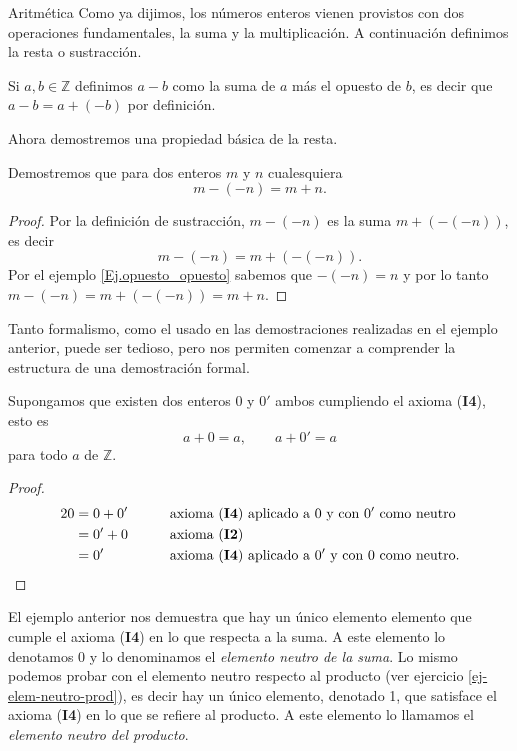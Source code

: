 \begin{section}{Aritmética}
Como ya dijimos, los números enteros vienen provistos con dos operaciones fundamentales, la suma y la multiplicación.
A continuación definimos la resta o sustracción. 

\begin{definicion} Si $a,b\in\mathbb{Z}$ definimos $a-b$ como la suma de $a$ más el opuesto de $b$, es decir que  $a-b=a+(-b)$ por definición.  
\end{definicion}

Ahora demostremos una propiedad básica de la resta.

\begin{ejemplo*} Demostremos que para dos enteros $m$ y $n$ cualesquiera
$$m-(-n) = m+n.$$ 
\end{ejemplo*}
\begin{proof} Por la definición de sustracción, $m-(-n)$ es la suma $m+(-(-n))$, es decir 
$$m-(-n)=m+(-(-n)).$$ 
Por el ejemplo \ref{Ej.opuesto_opuesto} sabemos que $-(-n)=n$ y por lo tanto $m-(-n)=m+(-(-n))=m+n$.
\end{proof}

Tanto formalismo, como el usado en las  demostraciones realizadas en el ejemplo anterior, puede ser tedioso, pero nos permiten comenzar a comprender la estructura de una demostración formal. 



\begin{ejemplo*} Supongamos que existen dos enteros $0$ y $0'$ ambos cumpliendo el  axioma (\textbf{I4}), esto es
$$
a+0= a, \qquad a+0'=a
$$
para todo $a$ de $\mathbb Z$. 
\end{ejemplo*}
\begin{proof}
\begin{alignat*}2
0 &= 0 + 0'&\qquad &\text{axioma (\textbf{I4}) aplicado a $0$ y con $0'$ como neutro} \\
&=0'+0&\qquad &\text{axioma (\textbf{I2})}\\
&= 0' &\qquad &\text{axioma (\textbf{I4}) aplicado a $0'$ y con $0$ como neutro}.
\end{alignat*}
\end{proof}


El ejemplo anterior nos demuestra que hay un único elemento elemento que cumple el axioma (\textbf{I4}) en lo que respecta a la suma. A este elemento lo denotamos $0$ y lo denominamos el {\em elemento neutro de la suma}. Lo mismo podemos probar con el elemento neutro respecto al producto (ver ejercicio \ref{ej-elem-neutro-prod}),  es decir hay un único elemento,  denotado 1, que satisface el axioma (\textbf{I4}) en lo que se refiere al producto. A  este elemento lo llamamos el {\em elemento neutro del producto}.  


\end{section}
